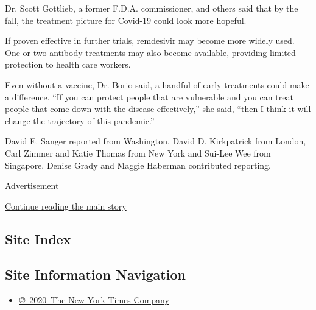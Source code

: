 Dr. Scott Gottlieb, a former F.D.A. commissioner, and others said that
by the fall, the treatment picture for Covid-19 could look more hopeful.

If proven effective in further trials, remdesivir may become more widely
used. One or two antibody treatments may also become available,
providing limited protection to health care workers.

Even without a vaccine, Dr. Borio said, a handful of early treatments
could make a difference. ``If you can protect people that are vulnerable
and you can treat people that come down with the disease effectively,''
she said, ``then I think it will change the trajectory of this
pandemic.''

David E. Sanger reported from Washington, David D. Kirkpatrick from
London, Carl Zimmer and Katie Thomas from New York and Sui-Lee Wee from
Singapore. Denise Grady and Maggie Haberman contributed reporting.

Advertisement

\protect\hyperlink{after-bottom}{Continue reading the main story}

\hypertarget{site-index}{%
\subsection{Site Index}\label{site-index}}

\hypertarget{site-information-navigation}{%
\subsection{Site Information
Navigation}\label{site-information-navigation}}

\begin{itemize}
\tightlist
\item
  \href{https://help.nytimes3xbfgragh.onion/hc/en-us/articles/115014792127-Copyright-notice}{©~2020~The
  New York Times Company}
\end{itemize}

